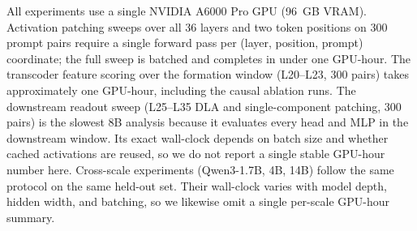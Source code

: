 All experiments use a single NVIDIA A6000 Pro GPU (96~GB VRAM).
Activation patching sweeps over all 36 layers and two token positions
on 300 prompt pairs require a single forward pass per (layer, position, prompt)
coordinate; the full sweep is batched and completes in under one GPU-hour.
The transcoder feature scoring over the formation window (L20--L23, 300 pairs)
takes approximately one GPU-hour, including the causal ablation runs.
The downstream readout sweep (L25--L35 DLA and single-component patching,
300 pairs) is the slowest 8B analysis because it evaluates every head and MLP
in the downstream window. Its exact wall-clock depends on batch size and
whether cached activations are reused, so we do not report a single stable
GPU-hour number here.
Cross-scale experiments (Qwen3-1.7B, 4B, 14B) follow the same protocol
on the same held-out set. Their wall-clock varies with model depth, hidden
width, and batching, so we likewise omit a single per-scale GPU-hour summary.
